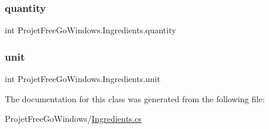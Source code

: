 \subsubsection{\texorpdfstring{quantity}{quantity}}
{\footnotesize\ttfamily int Projet\+Free\+Go\+Windows.\+Ingredients.\+quantity}

\mbox{\label{class_projet_free_go_windows_1_1_ingredients_aff450c1c13460e62822874c7bdd2d79d}} 
\subsubsection{\texorpdfstring{unit}{unit}}
{\footnotesize\ttfamily int Projet\+Free\+Go\+Windows.\+Ingredients.\+unit}



The documentation for this class was generated from the following file\+:\begin{DoxyCompactItemize}
\item 
Projet\+Free\+Go\+Windows/\hyperlink{_ingredients_8cs}{Ingredients.\+cs}\end{DoxyCompactItemize}
